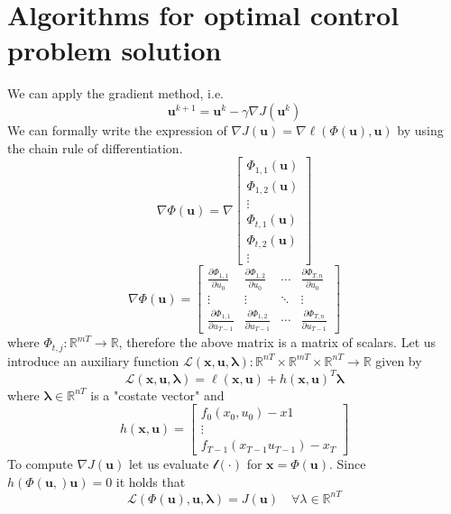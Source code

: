 \documentclass{book}
\newcommand{\R}{\mathbb{R}}
\theoremstyle{definition}
\theoremstyle{remark}
\theoremstyle{remark}
\begin{document}
\section{Algorithms for optimal control problem solution}
We can apply the gradient method, i.e. 
\[
    \mathbf{u}^{k+1}=\mathbf{u}^k-\gamma\nabla J(\mathbf{u}^k)
\]
We can formally write the expression of $\nabla J(\mathbf{u})=\nabla \ell(\Phi(\mathbf{u}),\mathbf{u})$ by using the chain rule of differentiation. 
\[
    \nabla\Phi(\mathbf{u}) = \nabla \begin{bmatrix}
        \Phi_{1,1}(\mathbf{u})\\
        \Phi_{1,2}(\mathbf{u})\\
        \vdots \\
        \Phi_{t,1}(\mathbf{u})\\
        \Phi_{t,2}(\mathbf{u})\\
        \vdots
    \end{bmatrix}
\]
\[
    \nabla\Phi(\mathbf{u}) = \begin{bmatrix}
        \displaystyle\frac{\partial \Phi_{1,1}}{\partial u_0} & \displaystyle\frac{\partial \Phi_{1,2}}{\partial u_0} & \cdots & \displaystyle\frac{\partial \Phi_{T,n}}{\partial u_0}\\
        \vdots & \vdots & \ddots & \vdots \\
        \displaystyle\frac{\partial \Phi_{1,1}}{\partial u_{T-1}} & \displaystyle\frac{\partial \Phi_{1,2}}{\partial u_{T-1}} &\cdots & \displaystyle\frac{\partial \Phi_{T,n}}{\partial u_{T-1}}
    \end{bmatrix}
\]
where $\Phi_{t,j}:\R^{mT}\to \R$, therefore the above matrix is a matrix of scalars.
Let us introduce an auxiliary function $\mathcal{L}(\mathbf{x},\mathbf{u},\mathbf{\lambda}):\R^{nT}\times \R^{mT} \times\R^{nT}\to \R$ given by 
\[
    \mathcal{L}(\mathbf{x},\mathbf{u},\mathbf{\lambda})=\ell(\mathbf{x},\mathbf{u})+h(\mathbf{x},\mathbf{u})^T\mathbf{\lambda}
\]
where $\mathbf{\lambda}\in\R^{nT}$ is a "costate vector" and 
\[
    h(\mathbf{x},\mathbf{u}) = \begin{bmatrix}
         f_0(x_0,u_0)-x1\\
         \vdots \\
         f_{T-1}(x_{T-1}u_{T-1})-x_T
    \end{bmatrix}
\]
To compute $\nabla J(\mathbf{u})$ let us evaluate $\mathcal{l}(\cdot)$ for $\mathbf{x} = \Phi(\mathbf{u})$. Since $h(\Phi(\mathbf{u},)\mathbf{u})=0$ it holds that 
\[
    \mathcal{L}(\Phi(\mathbf{u}),\mathbf{u},\mathbf{\lambda}) = J(\mathbf{u}) \quad \forall \lambda\in\R^{nT}
\]
\end{document}
